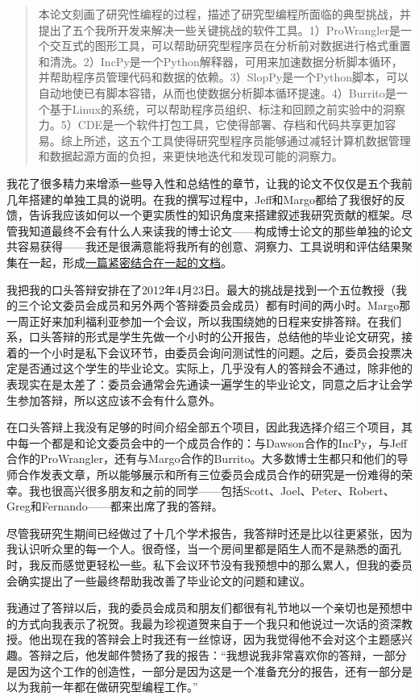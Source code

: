 \documentclass[letter,12pt]{book}
\begin{document}
\begin{CJK}{UTF8}{gbsn}
\begin{quote}
  本论文刻画了研究性编程的过程，描述了研究型编程所面临的典型挑战，并提出了五个我所开发来解决一些关键挑战的软件工具。1）ProWrangler是一个交互式的图形工具，可以帮助研究型程序员在分析前对数据进行格式重置和清洗。2）IncPy是一个Python解释器，可用来加速数据分析脚本循环，并帮助程序员管理代码和数据的依赖。3）SlopPy是一个Python脚本，可以自动地使已有脚本容错，从而也使数据分析脚本循环提速。4）Burrito是一个基于Linux的系统，可以帮助程序员组织、标注和回顾之前实验中的洞察力。5）CDE是一个软件打包工具，它使得部署、存档和代码共享更加容易。综上所述，这五个工具使得研究型程序员能够通过减轻计算机数据管理和数据起源方面的负担，来更快地迭代和发现可能的洞察力。
\end{quote}
我花了很多精力来增添一些导入性和总结性的章节，让我的论文不仅仅是五个我前几年搭建的单独工具的说明。在我的撰写过程中，Jeff和Margo都给了我很好的反馈，告诉我应该如何以一个更实质性的知识角度来搭建叙述我研究贡献的框架。尽管我知道最终不会有什么人来读我的博士论文——构成博士论文的那些单独的论文共容易获得——我还是很满意能将我所有的创意、洞察力、工具说明和评估结果聚集在一起，形成\href{http://www.pgbovine.net/projects/pubs/guo_phd_dissertation.pdf}{一篇紧密结合在一起的文档}。

\breakline

我把我的口头答辩安排在了2012年4月23日。最大的挑战是找到一个五位教授（我的三个论文委员会成员和另外两个答辩委员会成员）都有时间的两小时。Margo那一周正好来加利福利亚参加一个会议，所以我围绕她的日程来安排答辩。在我们系，口头答辩的形式是学生先做一个小时的公开报告，总结他的毕业论文研究，接着的一个小时是私下会议环节，由委员会询问测试性的问题。之后，委员会投票决定是否通过这个学生的毕业论文。实际上，几乎没有人的答辩会不通过，除非他的表现实在是太差了：委员会通常会先通读一遍学生的毕业论文，同意之后才让会学生参加答辩，所以这应该不会有什么意外。

在口头答辩上我没有足够的时间介绍全部五个项目，因此我选择介绍三个项目，其中每一个都是和论文委员会中的一个成员合作的：与Dawson合作的IncPy，与Jeff合作的ProWrangler，还有与Margo合作的Burrito。大多数博士生都只和他们的导师合作发表文章，所以能够展示和所有三位委员会成员合作的研究是一份难得的荣幸。我也很高兴很多朋友和之前的同学——包括Scott、Joel、Peter、Robert、Greg和Fernando——都来出席了我的答辩。

尽管我研究生期间已经做过了十几个学术报告，我答辩时还是比以往更紧张，因为我认识听众里的每一个人。很奇怪，当一个房间里都是陌生人而不是熟悉的面孔时，我反而感觉更轻松一些。私下会议环节没有我预想中的那么累人，但我的委员会确实提出了一些最终帮助我改善了毕业论文的问题和建议。

我通过了答辩以后，我的委员会成员和朋友们都很有礼节地以一个亲切也是预想中的方式向我表示了祝贺。我最为珍视道贺来自于一个我只和他说过一次话的资深教授。他出现在我的答辩会上时我还有一丝惊讶，因为我觉得他不会对这个主题感兴趣。答辩之后，他发邮件赞扬了我的报告：“我想说我非常喜欢你的答辩，一部分是因为这个工作的创造性，一部分是因为这是一个准备充分的报告，还有一部分是以为我前一年都在做研究型编程工作。”


\end{CJK}
\end{document}

